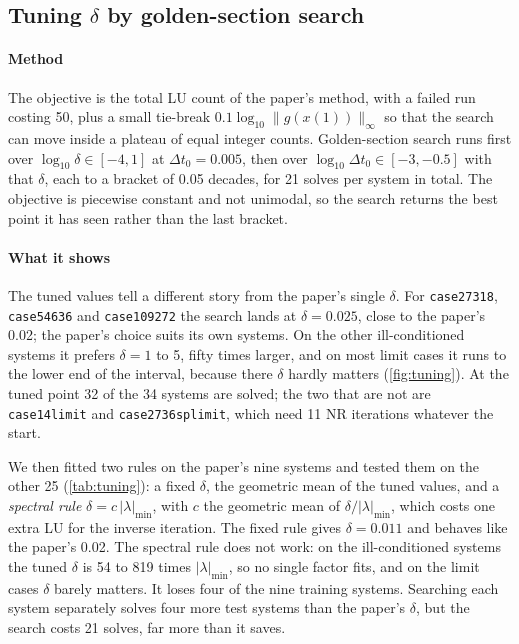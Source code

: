 \documentclass[11pt,a4paper]{article}
\newcommand{\ninf}[1]{\lVert #1\rVert_\infty}
\newcommand{\code}[1]{\texttt{#1}}
\begin{document}
\subsection{\texorpdfstring{Tuning $\delta$ by golden-section search}{Tuning delta by golden-section search}}
\paragraph{Method} The objective is the total LU count of the paper's method, with a failed run costing 50,
plus a small tie-break $0.1\log_{10}\ninf{g(x(1))}$ so that the search can move inside a plateau of equal
integer counts. Golden-section search runs first over $\log_{10}\delta\in[-4,1]$ at $\Delta t_0=0.005$, then
over $\log_{10}\Delta t_0\in[-3,-0.5]$ with that $\delta$, each to a bracket of 0.05 decades, for 21 solves
per system in total. The objective is piecewise constant and not unimodal, so the search returns the best
point it has seen rather than the last bracket.

\paragraph{What it shows} The tuned values tell a different story from the paper's single $\delta$. For
\code{case27318}, \code{case54636} and \code{case109272} the search lands at $\delta=0.025$, close to the
paper's 0.02; the paper's choice suits its own systems. On the other ill-conditioned systems it prefers
$\delta=1$ to 5, fifty times larger, and on most limit cases it runs to the lower end of the interval,
because there $\delta$ hardly matters (\cref{fig:tuning}). At the tuned point 32 of the 34 systems are
solved; the two that are not are \code{case14limit} and \code{case2736splimit}, which need 11 NR iterations
whatever the start.

We then fitted two rules on the paper's nine systems and tested them on the other 25 (\cref{tab:tuning}): a
fixed $\delta$, the geometric mean of the tuned values, and a \emph{spectral rule} $\delta=c\,|\lambda|_{\min}$,
with $c$ the geometric mean of $\delta/|\lambda|_{\min}$, which costs one extra LU for the inverse iteration.
The fixed rule gives $\delta=0.011$ and behaves like the paper's 0.02. The spectral rule does not work: on
the ill-conditioned systems the tuned $\delta$ is 54 to 819 times $|\lambda|_{\min}$, so no single factor fits,
and on the limit cases $\delta$ barely matters. It loses four of the nine training systems. Searching each
system separately solves four more test systems than the paper's $\delta$, but the search costs 21 solves,
far more than it saves.
\end{document}
